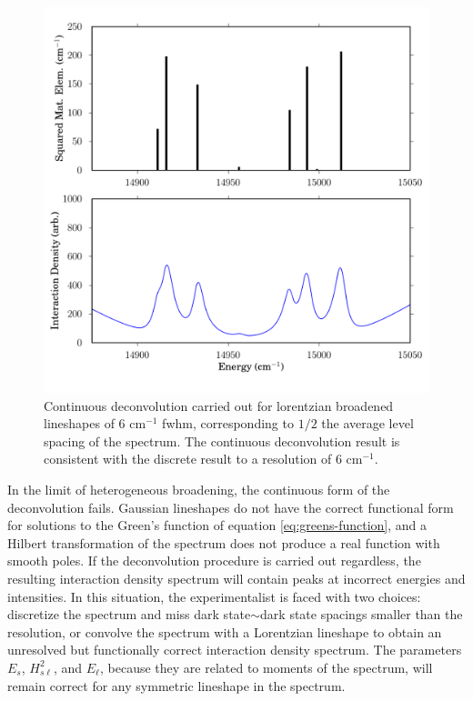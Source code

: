 \documentclass[12pt]{mitthesis}
\begin{document}
\begin{figure}
  \caption{Continuous deconvolution carried out for lorentzian
    broadened lineshapes of 6 cm$^{-1}$ fwhm, corresponding to $1/2$
    the average level spacing of the spectrum.  The continuous
    deconvolution result is consistent with the discrete result to a
    resolution of 6 cm$^{-1}$.  }
  \label{fig:broadened}
  \centering
  \includegraphics[width=6in]{smalley-compare-fwhm6.png}
\end{figure}

In the limit of heterogeneous broadening, the continuous form of the
deconvolution fails.  Gaussian lineshapes do not have the correct
functional form for solutions to the Green's function of equation
\ref{eq:greens-function}, and a Hilbert transformation of the spectrum
does not produce a real function with smooth poles.  If the
deconvolution procedure is carried out regardless, the resulting
interaction density spectrum will contain peaks at incorrect energies
and intensities.  In this situation, the experimentalist is faced with
two choices: discretize the spectrum and miss dark state$\sim$dark
state spacings smaller than the resolution, or convolve the spectrum
with a Lorentzian lineshape to obtain an unresolved but functionally
correct interaction density spectrum.  The parameters $E_s$,
$H_{s\ell}^2$, and $E_{\ell}$, because they are related to moments of
the spectrum, will remain correct for any symmetric lineshape in the
spectrum.
\end{document}
